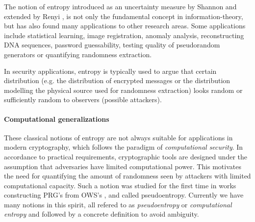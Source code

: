 \documentclass[12pt]{report}
\begin{document}
The notion of entropy introduced as an uncertainty measure by Shannon \cite{Shannon:2001:MTC:584091.584093} and extended by Renyi \cite{renyi1961}, 
is not only the fundamental concept in information-theory, but has also found many applications to other research areas.
Some applications include
statistical learning,
image registration,
anomaly analysis,
reconstructing DNA sequences,
password guessability,
testing quality of pseudorandom generators or
quantifying randomness extraction.

In security applications, entropy is typically used to argue that certain distribution (e.g. the distribution of encrypted messages
or the distribution modelling the physical source used for randomness extraction) looks random or sufficiently random to observers (possible attackers).

\paragraph{Computational generalizations}

These classical notions of entropy are not always suitable for applications in modern cryptography, 
which follows the paradigm of \emph{computational security}. In accordance to practical requirements, cryptographic tools are designed under the assumption that adversaries have limited computational power.
This motivates the need for quantifying the amount of randomness seen by attackers with limited computational capacity.
Such a notion was studied for the first time in works constructing PRG's from OWS's \cite{Impagliazzo1989,DBLP:journals/siamcomp/HastadILL99}, and called {pseudoentropy}. Currently we have many notions in this spirit, all refered to as \emph{pseudoentropy} or \emph{computational entropy} and followed by a concrete definition to avoid ambiguity.
\end{document}
